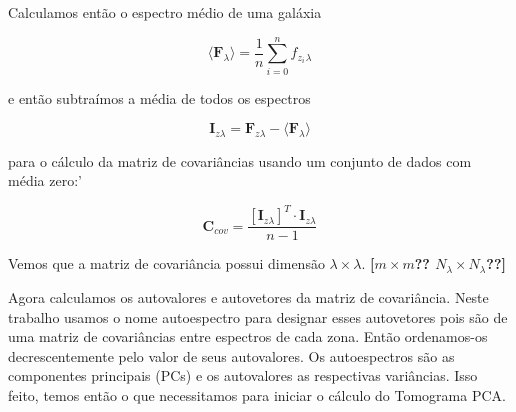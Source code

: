 Calculamos então o espectro médio de uma galáxia 

\begin{equation}
\langle
\textbf{F}{}_\lambda \rangle = \frac{1}{n} \sum_{i=0}^{n} f_{z_i}{}_{\lambda}
\end{equation}

\noindent e então subtraímos a média de todos os espectros

\begin{equation}
\textbf{I}{}_{z \lambda} =
\textbf{F}{}_{z \lambda} - \langle \textbf{F}{}_\lambda \rangle
\end{equation}

\noindent para o cálculo
da matriz de covariâncias usando um conjunto de dados com média zero:'

\begin{equation}
	\label{eq:PCA:covMatrix}
	\mathbf{C}{}_{cov} = \frac{[\mathbf{I}{}_{z \lambda}]^T \cdot \mathbf{I}{}_{z
	\lambda}}{n - 1}
\end{equation}

\noindent Vemos que
a matriz de covariância possui dimensão $\lambda \times \lambda$. 
{\bf[\ojo $m \times m$?? $N_\lambda \times N_\lambda$??]}

Agora calculamos os autovalores e autovetores da matriz de covariância. Neste
trabalho usamos o nome autoespectro para designar esses autovetores pois são de
uma matriz de covariâncias entre espectros de cada zona. Então ordenamos-os
decrescentemente pelo valor de seus autovalores. Os autoespectros são as componentes principais (PCs) e
os autovalores as respectivas variâncias. Isso feito, temos então o que necessitamos para
iniciar o cálculo do Tomograma PCA.

